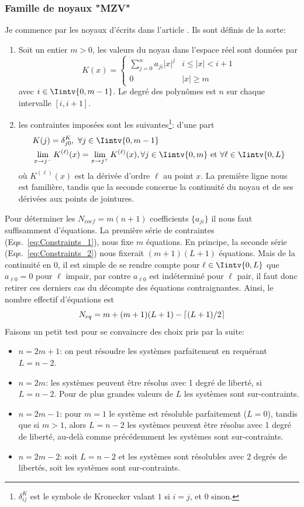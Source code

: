 \documentclass[11pt,twoside]{article}
\newcommand{\itemb}{\item[$\bullet$]}
\DeclarePairedDelimiter\ceil{\lceil}{\rceil}
\begin{document}
\subsubsection{Famille de noyaux "MZV"}
%
Je commence par les noyaux d'écrits dans l'article \cite{Meijering1999}. Ils sont définis de la sorte:
\begin{enumerate}
\item Soit un entier $m>0$, les valeurs du noyau dans l'espace réel sont données par
\begin{equation}
K(x) =\begin{cases}
\sum_{j=0}^n a_{ji} |x|^{j} & i\leq |x| < i+1 \\
0 & |x|\geq m
\end{cases}
\end{equation}
avec  $i\in \Iintv{0,m-1}$. Le degré des polynômes est $n$ sur chaque intervalle $[i,i+1]$.
\item les contraintes imposées sont les suivantes\footnote{$\delta^K_{ij}$ est le symbole de Kronecker valant $1$ si $i=j$, et $0$ sinon.}: d'une part
\begin{align}
&K(j) = \delta^K_{j0},\ \forall j\in \Iintv{0,m-1} \label{eq:Constraints_1}\\
&\lim_{x\rightarrow j^{-}}K^{(\ell)}(x) = \lim_{x\rightarrow j^{+}}K^{(\ell)}(x), \forall j\in \Iintv{0,m} \ \mathrm{et}\ \forall \ell \in  \Iintv{0,L} \label{eq:Constraints_2}
\end{align} 
où $K^{(\ell)}(x)$ est la dérivée d'ordre $\ell$ au point $x$. La première ligne nous est familière, tandis que la seconde concerne la continuité du noyau et de ses dérivées aux points de jointures.
\end{enumerate}
Pour déterminer les $N_{coef}=m(n+1)$ coefficients $\{a_{ji}\}$ il nous faut suffisamment d'équations. La première série de contraintes (Eqs.~\ref{eq:Constraints_1}), nous fixe $m$ équations.  En principe, la seconde série (Eqs.~\ref{eq:Constraints_2}) nous fixerait $(m+1)(L+1)$ équations. Mais de la  continuité en $0$, il est simple de se rendre compte  pour $\ell \in  \Iintv{0,L}$ que $a_{\ell 0}=0$ pour $\ell$ impair, par contre $a_{\ell 0}$ est indéterminé pour $\ell$ pair, il faut donc retirer ces derniers cas du décompte des équations contraignantes. Ainsi, le nombre effectif d'équations est 
\begin{equation}
N_{eq} = m +  (m+1)(L+1) - \ceil{(L+1)/2}
\end{equation}
Faisons un petit test pour se convaincre des choix pris par la suite:
\begin{itemize}
\itemb $n=2m+1$: on peut résoudre les systèmes parfaitement en requérant $L=n-2$.
\itemb $n=2m$: les systèmes peuvent être résolus avec 1 degré de liberté, si $L=n-2$. Pour de plus grandes valeurs de $L$ les systèmes sont sur-contraints.
\itemb $n=2m-1$: pour $m=1$ le système est résoluble parfaitement ($L=0$), tandis que si $m>1$, alors $L=n-2$ les systèmes peuvent être résolus avec 1 degré de liberté, au-delà comme précédemment les systèmes sont sur-contraints.
\itemb $n=2m-2$: soit $L=n-2$ et les systèmes sont résolubles avec 2 degrés de libertés, soit les systèmes sont sur-contraints. 
\end{itemize}
\end{document}

